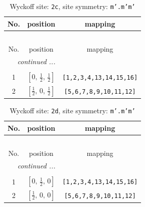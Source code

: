 \documentclass[fleqn,8pt]{jsarticle}
\begin{document}
\renewcommand{\arraystretch}{1.2}
\begin{longtable}{ccc}
\caption{Wyckoff site: {\tt 2c}, site symmetry: {\tt m'.m'm'}}
 \\
 \hline \hline
No. & position & mapping \\ \hline \endfirsthead

\multicolumn{2}{l}{\tablename\ \thetable{}} \\
 \hline \hline
No. & position & mapping \\ \hline \endhead

 \hline \hline
\multicolumn{2}{r}{\footnotesize\it continued ...} \\ \endfoot

 \hline \hline
\multicolumn{2}{r}{} \\ \endlastfoot

1 & $\left[ 0,\, \frac{1}{2},\, \frac{1}{2} \right]$ & {\tt [1,2,3,4,13,14,15,16]} \\ \hline
2 & $\left[ \frac{1}{2},\, 0,\, \frac{1}{2} \right]$ & {\tt [5,6,7,8,9,10,11,12]} \\
\end{longtable}
\renewcommand{\arraystretch}{1.2}
\begin{longtable}{ccc}
\caption{Wyckoff site: {\tt 2d}, site symmetry: {\tt m'.m'm'}}
 \\
 \hline \hline
No. & position & mapping \\ \hline \endfirsthead

\multicolumn{2}{l}{\tablename\ \thetable{}} \\
 \hline \hline
No. & position & mapping \\ \hline \endhead

 \hline \hline
\multicolumn{2}{r}{\footnotesize\it continued ...} \\ \endfoot

 \hline \hline
\multicolumn{2}{r}{} \\ \endlastfoot

1 & $\left[ 0,\, \frac{1}{2},\, 0 \right]$ & {\tt [1,2,3,4,13,14,15,16]} \\ \hline
2 & $\left[ \frac{1}{2},\, 0,\, 0 \right]$ & {\tt [5,6,7,8,9,10,11,12]} \\
\end{longtable}
\renewcommand{\arraystretch}{1.2}
\end{document}
